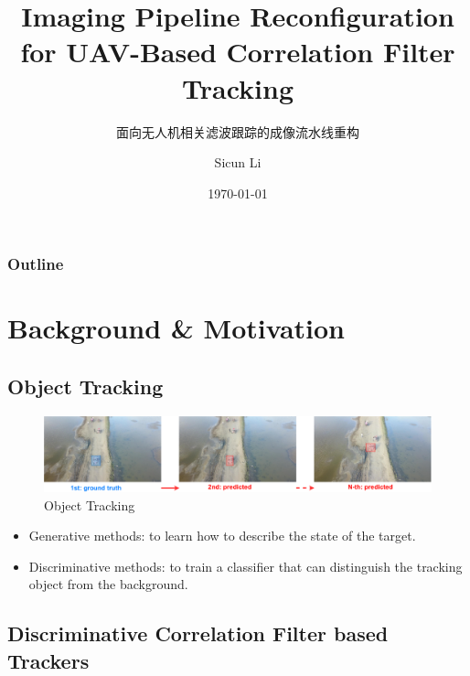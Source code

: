\documentclass{beamer}
\author{Sicun Li}
\title{Imaging Pipeline Reconfiguration for UAV-Based Correlation Filter Tracking}
\subtitle{面向无人机相关滤波跟踪的成像流水线重构}
\institute{School of Microelectronics}
\date{\today}
\begin{document}
\begin{frame}
    \titlepage
\end{frame}

\begin{frame}
    \frametitle{Outline}
    \tableofcontents[sectionstyle=show,subsectionstyle=show/shaded/hide,subsubsectionstyle=show/shaded/hide]
\end{frame}

\section{Background \& Motivation}

\subsection{Object Tracking}

\begin{frame}
    \begin{figure}[htpb]
        \begin{center}
            \includegraphics[width=1.0\linewidth]{fig/obt.pdf}
            \caption{Object Tracking}
        \end{center}
    \end{figure}
\end{frame}

\begin{frame}
    \begin{itemize}[<+-| alert@+>]
        \item Generative methods: to learn how to describe the state of the target.
        \item Discriminative methods: to train a classifier that can distinguish the tracking object from the background.
    \end{itemize}
\end{frame}

\subsection{Discriminative Correlation Filter based Trackers}
\end{document}
